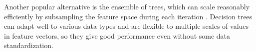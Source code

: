 Another popular alternative is the ensemble of trees, which can scale reasonably efficiently by subsampling the feature space during each iteration \cite{breiman2001random}.
Decision trees can adapt well to various data types and are flexible to multiple scales of values in feature vectors, so they give good performance even without some data standardization.

